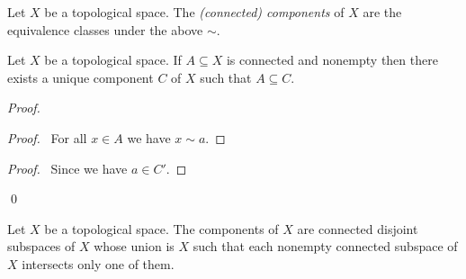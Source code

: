 \begin{definition}
    Let $X$ be a topological space. The \emph{(connected) components} of
    $X$ are the equivalence classes under the above $\sim$.
\end{definition}

\begin{lemma}
    \label{lemma:component_includes_connected}
    Let $X$ be a topological space. If $A \subseteq X$ is connected 
    and nonempty then there
    exists a unique component $C$ of $X$ such that $A \subseteq C$.
\end{lemma}

\begin{proof}
    \pf
    \begin{proof}
        \pf\ For all $x \in A$ we have $x \sim a$.
    \end{proof}
    \begin{proof}
        \pf\ Since we have $a \in C'$.
    \end{proof}
    \qed
\end{proof}

\begin{theorem}
    Let $X$ be a topological space. The components of $X$ are connected
    disjoint subspaces of $X$ whose union is $X$ such that each nonempty
    connected subspace of $X$ intersects only one of them.
\end{theorem}

